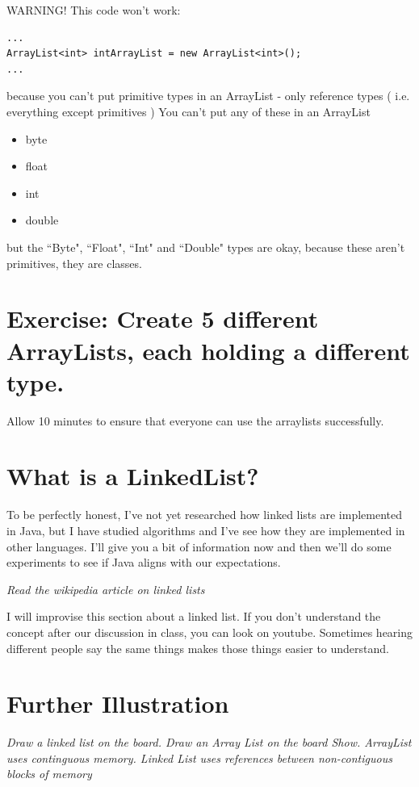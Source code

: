 \documentclass[12pt]{article}
\begin{document}


WARNING! This code won't work:
\begin{lstlisting}
...
ArrayList<int> intArrayList = new ArrayList<int>();
...
\end{lstlisting}

because you can't put primitive types in an ArrayList - only reference types ( i.e. everything except primitives )
You can't put any of these in an ArrayList

\begin{itemize}
\item byte
\item float
\item int
\item double
\end{itemize}

but the ``Byte", ``Float", ``Int" and ``Double" types are okay, because these aren't primitives, they are classes.


\section{Exercise: Create 5 different ArrayLists, each holding a different type.}

Allow 10 minutes to ensure that everyone can use the arraylists successfully.


\section{What is a LinkedList?}
To be perfectly honest, I've not yet researched how linked lists are implemented in Java, but I have studied algorithms and I've see how they are implemented in other languages. I'll give you a bit of information now and then we'll do some experiments to see if Java aligns with our expectations.


\textit{Read the wikipedia article on linked lists}

I will improvise this section about a linked list. If you don't understand the concept after our discussion in class, you can look on youtube. Sometimes hearing different people say the same things makes those things easier to understand.

\section{Further Illustration}
\begin{center}
{\LARGE \textit{Draw a linked list on the board. Draw an Array List on the board Show. ArrayList uses continguous memory. Linked List uses references between non-contiguous blocks of memory}}
\end{center}
\end{document}
